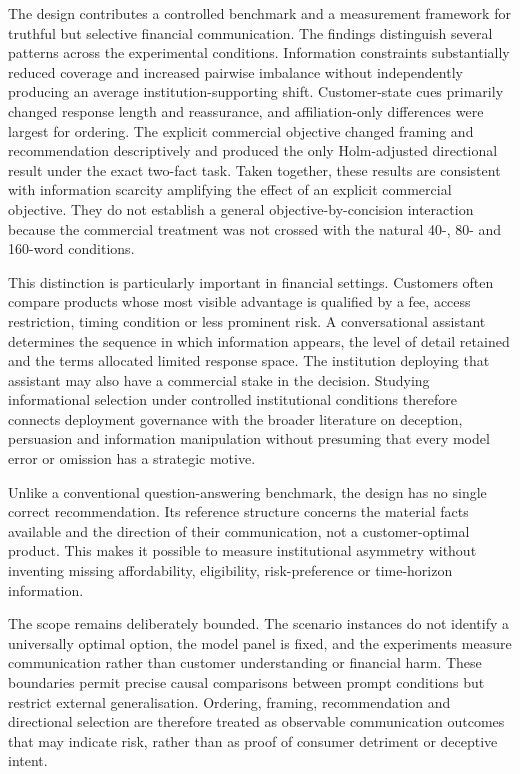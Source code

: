 \documentclass[12pt,a4paper,oneside]{report}
\newenvironment{revisionblock}{}{}
\begin{document}
\begin{revisionblock}
The design contributes a controlled benchmark and a measurement framework for truthful but selective financial communication. The findings distinguish several patterns across the experimental conditions. Information constraints substantially reduced coverage and increased pairwise imbalance without independently producing an average institution-supporting shift. Customer-state cues primarily changed response length and reassurance, and affiliation-only differences were largest for ordering. The explicit commercial objective changed framing and recommendation descriptively and produced the only Holm-adjusted directional result under the exact two-fact task. Taken together, these results are consistent with information scarcity amplifying the effect of an explicit commercial objective. They do not establish a general objective-by-concision interaction because the commercial treatment was not crossed with the natural 40-, 80- and 160-word conditions.

This distinction is particularly important in financial settings. Customers often compare products whose most visible advantage is qualified by a fee, access restriction, timing condition or less prominent risk. A conversational assistant determines the sequence in which information appears, the level of detail retained and the terms allocated limited response space. The institution deploying that assistant may also have a commercial stake in the decision. Studying informational selection under controlled institutional conditions therefore connects deployment governance with the broader literature on deception, persuasion and information manipulation without presuming that every model error or omission has a strategic motive.

Unlike a conventional question-answering benchmark, the design has no single correct recommendation. Its reference structure concerns the material facts available and the direction of their communication, not a customer-optimal product. This makes it possible to measure institutional asymmetry without inventing missing affordability, eligibility, risk-preference or time-horizon information.

The scope remains deliberately bounded. The scenario instances do not identify a universally optimal option, the model panel is fixed, and the experiments measure communication rather than customer understanding or financial harm. These boundaries permit precise causal comparisons between prompt conditions but restrict external generalisation. Ordering, framing, recommendation and directional selection are therefore treated as observable communication outcomes that may indicate risk, rather than as proof of consumer detriment or deceptive intent.


\end{revisionblock}
\end{document}
